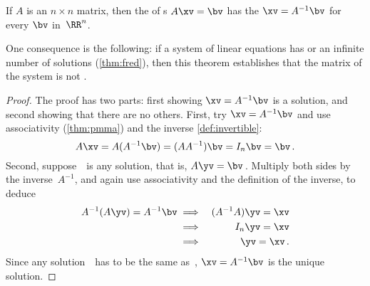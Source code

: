 \begin{theorem} \label{thm:invuniqsol} 
If \(A\) is an  \(n\times n\) matrix, then the  of s \(A\xv=\bv\) has the  \(\xv=A^{-1}\bv\) for every \(\bv\) in~\(\RR^n\).
\end{theorem}

One consequence is the following: if a system of linear equations has  or an infinite number of solutions (\autoref{thm:fred}), then this theorem establishes that the matrix of the system is not .

\begin{proof} 
The proof has two parts: first showing \(\xv=A^{-1}\bv\) is a solution, and second showing that there are no others.
First,  try \(\xv=A^{-1}\bv\) and use associativity (\autoref{thm:pmma}) and the inverse \autoref{def:invertible}:
\begin{equation*}
A\xv=A(A^{-1}\bv)=(AA^{-1})\bv=I_n\bv=\bv\,.
\end{equation*}
Second, suppose~\yv\ is any solution, that is, \(A\yv=\bv\)\,.
Multiply both sides by the inverse~\(A^{-1}\), and again use associativity and the definition of the inverse, to deduce
\begin{eqnarray*}
A^{-1}(A\yv)=A^{-1}\bv
&\implies& (A^{-1}A)\yv=\xv
\\&\implies& I_n\yv=\xv
\\&\implies& \yv=\xv\,.
\end{eqnarray*}
Since any solution~\yv\ has to be the same as~\xv, \(\xv=A^{-1}\bv\) is the unique solution.
\end{proof}






